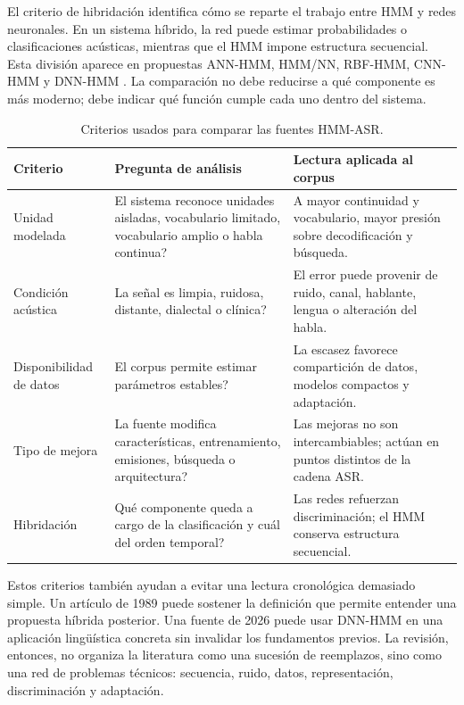 El criterio de hibridación identifica cómo se reparte el trabajo entre HMM y redes neuronales. En un sistema híbrido, la red puede estimar probabilidades o clasificaciones acústicas, mientras que el HMM impone estructura secuencial. Esta división aparece en propuestas ANN-HMM, HMM/NN, RBF-HMM, CNN-HMM y DNN-HMM \cite{Cohen1992HybridNeural,Kundu1998SpeechRecogn,Tang2009HybridHidden,Justin2013HybridSpeech,Chen2020ResearImprov,Shanthamallappa2026DeepNeural}. La comparación no debe reducirse a qué componente es más moderno; debe indicar qué función cumple cada uno dentro del sistema.

\begin{table}[H]
\centering
\footnotesize
\setlength{\tabcolsep}{4pt}
\renewcommand{\arraystretch}{0.92}
\caption{Criterios usados para comparar las fuentes HMM-ASR.}
\label{tab:criterios_analisis}
\begin{tabular}{L{0.20\textwidth}L{0.33\textwidth}L{0.35\textwidth}}
\toprule
\textbf{Criterio} & \textbf{Pregunta de análisis} & \textbf{Lectura aplicada al corpus} \\
\midrule
Unidad modelada & \textquestiondown{}El sistema reconoce unidades aisladas, vocabulario limitado, vocabulario amplio o habla continua? & A mayor continuidad y vocabulario, mayor presión sobre decodificación y búsqueda. \\
Condición acústica & \textquestiondown{}La señal es limpia, ruidosa, distante, dialectal o clínica? & El error puede provenir de ruido, canal, hablante, lengua o alteración del habla. \\
Disponibilidad de datos & \textquestiondown{}El corpus permite estimar parámetros estables? & La escasez favorece compartición de datos, modelos compactos y adaptación. \\
Tipo de mejora & \textquestiondown{}La fuente modifica características, entrenamiento, emisiones, búsqueda o arquitectura? & Las mejoras no son intercambiables; actúan en puntos distintos de la cadena ASR. \\
Hibridación & \textquestiondown{}Qué componente queda a cargo de la clasificación y cuál del orden temporal? & Las redes refuerzan discriminación; el HMM conserva estructura secuencial. \\
\bottomrule
\end{tabular}
\end{table}

Estos criterios también ayudan a evitar una lectura cronológica demasiado simple. Un artículo de 1989 puede sostener la definición que permite entender una propuesta híbrida posterior. Una fuente de 2026 puede usar DNN-HMM en una aplicación lingüística concreta sin invalidar los fundamentos previos. La revisión, entonces, no organiza la literatura como una sucesión de reemplazos, sino como una red de problemas técnicos: secuencia, ruido, datos, representación, discriminación y adaptación.

